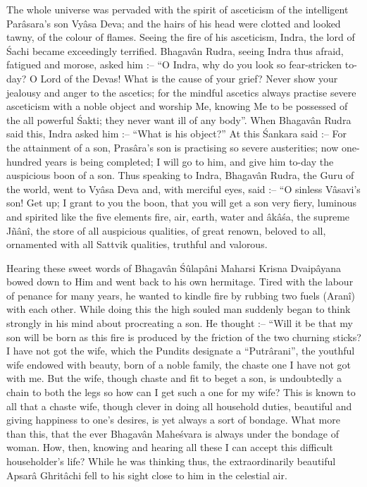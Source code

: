 The whole universe was pervaded with the spirit of asceticism of the intelligent Par\^asara's son Vy\^asa Deva; and the hairs of his head were clotted and looked tawny, of the colour of flames. Seeing the fire of his asceticism, Indra, the lord of \'Sachi became exceedingly terrified. Bhagav\^an Rudra, seeing Indra thus afraid, fatigued and morose, asked him :-- ``O Indra, why do you look so fear-stricken to-day? O Lord of the Devas! What is the cause of your grief? Never show your jealousy and anger to the ascetics; for the mindful ascetics always practise severe asceticism with a noble object and worship Me, knowing Me to be possessed of the all powerful \'Sakti; they never want ill of any body''. When Bhagav\^an Rudra said this, Indra asked him :-- ``What is his object?'' At this \'Sankara said :-- For the attainment of a son, Pras\^ara's son is practising so severe austerities; now one-hundred years is being completed; I will go to him, and give him to-day the auspicious boon of a son. Thus speaking to Indra, Bhagav\^an Rudra, the Guru of the world, went to Vy\^asa Deva and, with merciful eyes, said :-- ``O sinless V\^asavi's son! Get up; I grant to you the boon, that you will get a son very fiery, luminous and spirited like the five elements fire, air, earth, water and \^ak\^a\'sa, the supreme Jñ\^an\^i, the store of all auspicious qualities, of great renown, beloved to all, ornamented with all Sattvik qualities, truthful and valorous.

Hearing these sweet words of Bhagav\^an \'S\^ulap\^ani Maharsi Krisna Dvaip\^ayana bowed down to Him and went back to his own hermitage. Tired with the labour of penance for many years, he wanted to kindle fire by rubbing two fuels (Aran\^i) with each other. While doing this the high souled man suddenly began to think strongly in his mind about procreating a son. He thought :-- ``Will it be that my son will be born as this fire is produced by the friction of the two churning sticks? I have not got the wife, which the Pundits designate a ``Putr\^arani'', the youthful wife endowed with beauty, born of a noble family, the chaste one I have not got with me. But the wife, though chaste and fit to beget a son, is undoubtedly a chain to both the legs so how can I get such a one for my wife? This is known to all that a chaste wife, though clever in doing all household duties, beautiful and giving happiness to one's desires, is yet always a sort of bondage. What more than this, that the ever Bhagav\^an Mahe\'svara is always under the bondage of woman. How, then, knowing and hearing all these I can accept this difficult householder's life? While he was thinking thus, the extraordinarily beautiful Apsar\^a Ghrit\^achi fell to his sight close to him in the celestial air.

